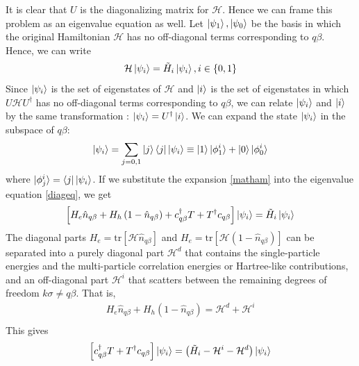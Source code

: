 \documentclass[twoside,11pt]{report}
\numberwithin{equation}{section}
\begin{document}
It is clear that \(U\) is the diagonalizing matrix for \(\mathcal{H}\). Hence we can frame this problem as an eigenvalue equation as well. Let \(\ket{\psi_1},\ket{\psi_0}\) be the basis in which the original Hamiltonian \(\mathcal{H}\) has no off-diagonal terms corresponding to \(q\beta\). Hence, we can write
\begin{equation}\begin{aligned}
	\label{diageq}
    \mathcal{H} \ket{\psi_i} = \tilde H_i\ket{\psi_i}, i\in\left\{0,1\right\}
\end{aligned}\end{equation}
Since \(\ket{\psi_i}\) is the set of eigenstates of \(\mathcal{H}\) and \(\ket{i}\) is the set of eigenstates in which \(U\mathcal{H} U^\dagger\) has no off-diagonal terms corresponding to \(q\beta\), we can relate \(\ket{\psi_i}\) and \(\ket{i}\) by the same transformation : \(\ket{\psi_i} = U^\dagger\ket{i}\). We can expand the state \(\ket{\psi_i}\) in the subspace of \(q\beta\):
\begin{equation}\begin{aligned}
	\label{matpsi}
\ket{\psi_i} = \sum_{j=0,1} \ket{j}\bra{j}\ket{\psi_i} \equiv \ket{1}\ket{\phi_1^i} + \ket{0}\ket{\phi_0^i}\end{aligned}\end{equation}
where \(\ket{\phi_j^i} = \bra{j}\ket{\psi_i}\). If we substitute the expansion \ref{matham} into the eigenvalue equation \ref{diageq}, we get
\begin{equation}\begin{aligned}
	\left[H_e \hat n_{q\beta} + H_h \left(1 - \hat n_{q\beta}\right) + c^\dagger_{q\beta}T + T^\dagger c_{q\beta}\right]\ket{\psi_i} = \tilde H_i\ket{\psi_i}
\end{aligned}\end{equation}
The diagonal parts \(H_e = \text{tr}\left[\mathcal{H} \hat n_{q\beta}\right]\) and \(H_e = \text{tr}\left[\mathcal{H} \left(1 - \hat n_{q\beta}\right)\right]\) can be separated into a purely diagonal part \(\mathcal{H}^d\) that contains the single-particle energies and the multi-particle correlation energies or Hartree-like contributions, and an off-diagonal part  \(\mathcal{H}^i\) that scatters between the remaining degrees of freedom \(k\sigma \neq q\beta\). That is,
\begin{equation*}
\begin{gathered}
	H_e \hat n_{q\beta} + H_h \left(1 - \hat n_{q\beta}\right) = \mathcal{H}^d + \mathcal{H}^i\\
\end{gathered}
\end{equation*}
This gives
\begin{equation}\begin{aligned}
	\left[c^\dagger_{q\beta}T + T^\dagger c_{q\beta}\right]\ket{\psi_i} = \left(\tilde H_i - \mathcal{H}^i - \mathcal{H}^d\right)\ket{\psi_i}
\end{aligned}\end{equation}
\end{document}
